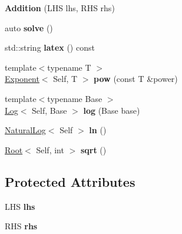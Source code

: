 \begin{DoxyCompactItemize}
\item 
\hypertarget{classlatex_1_1math_1_1Addition_ade3a2eff41f8aaef8f77c2b2bb238b57}{{\bfseries \-Addition} (\-L\-H\-S lhs, \-R\-H\-S rhs)}\label{classlatex_1_1math_1_1Addition_ade3a2eff41f8aaef8f77c2b2bb238b57}

\item 
\hypertarget{classlatex_1_1math_1_1Addition_a69f19bb11a63d8631b6e0d246b994c00}{auto {\bfseries solve} ()}\label{classlatex_1_1math_1_1Addition_a69f19bb11a63d8631b6e0d246b994c00}

\item 
\hypertarget{classlatex_1_1math_1_1Addition_a03c226a26292f1203370bedf162731a0}{std\-::string {\bfseries latex} () const }\label{classlatex_1_1math_1_1Addition_a03c226a26292f1203370bedf162731a0}

\item 
\hypertarget{classlatex_1_1math_1_1Addition_aeb8aded4d72c95ac93539860321f2d0b}{{\footnotesize template$<$typename T $>$ }\\\hyperlink{classlatex_1_1math_1_1Exponent}{\-Exponent}$<$ \-Self, \-T $>$ {\bfseries pow} (const \-T \&power)}\label{classlatex_1_1math_1_1Addition_aeb8aded4d72c95ac93539860321f2d0b}

\item 
\hypertarget{classlatex_1_1math_1_1Addition_aeafa689b3df0a4c99396c3f5d12d40a5}{{\footnotesize template$<$typename Base $>$ }\\\hyperlink{classlatex_1_1math_1_1Log}{\-Log}$<$ \-Self, \-Base $>$ {\bfseries log} (\-Base base)}\label{classlatex_1_1math_1_1Addition_aeafa689b3df0a4c99396c3f5d12d40a5}

\item 
\hypertarget{classlatex_1_1math_1_1Addition_adf1963ebf74f64325555149dcefaf30a}{\hyperlink{classlatex_1_1math_1_1NaturalLog}{\-Natural\-Log}$<$ \-Self $>$ {\bfseries ln} ()}\label{classlatex_1_1math_1_1Addition_adf1963ebf74f64325555149dcefaf30a}

\item 
\hypertarget{classlatex_1_1math_1_1Addition_a8c94bab6a8b94636f0a1215d8690f273}{\hyperlink{classlatex_1_1math_1_1Root}{\-Root}$<$ \-Self, int $>$ {\bfseries sqrt} ()}\label{classlatex_1_1math_1_1Addition_a8c94bab6a8b94636f0a1215d8690f273}

\end{DoxyCompactItemize}
\subsection*{\-Protected \-Attributes}
\begin{DoxyCompactItemize}
\item 
\hypertarget{classlatex_1_1math_1_1Addition_ac8d2192970f9214c489f803756453bf0}{\-L\-H\-S {\bfseries lhs}}\label{classlatex_1_1math_1_1Addition_ac8d2192970f9214c489f803756453bf0}

\item 
\hypertarget{classlatex_1_1math_1_1Addition_aa5abec9e5629652699b7e34887ec94a6}{\-R\-H\-S {\bfseries rhs}}\label{classlatex_1_1math_1_1Addition_aa5abec9e5629652699b7e34887ec94a6}

\end{DoxyCompactItemize}
